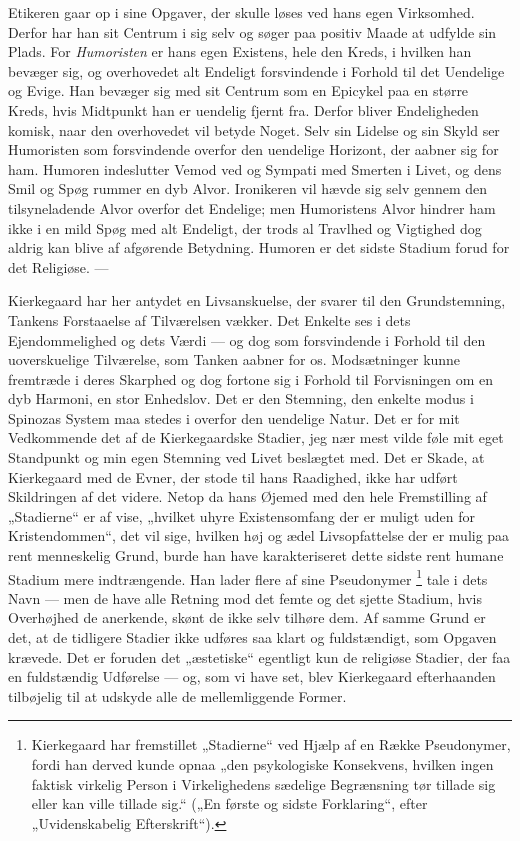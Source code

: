 \documentclass[12pt,a4paper,openany]{book}
\newcommand{\opage}[1]{\marginnote{\footnotesize\textit{[#1]}}}
\begin{document}
Etikeren gaar op i sine Opgaver, der skulle løses ved hans egen Virksomhed.
Derfor har han sit Centrum i sig selv og søger paa positiv Maade at udfylde sin
Plads. For \textit{Humoristen} er hans egen Existens, hele den Kreds, i hvilken
han bevæger sig, og overhovedet alt Endeligt forsvindende i Forhold til det
Uendelige og Evige. Han bevæger sig med sit Centrum som en Epicykel paa en
større Kreds, hvis Midtpunkt han er uendelig fjernt fra. Derfor bliver
Endeligheden komisk, naar den overhovedet vil betyde Noget. Selv sin Lidelse og
sin Skyld ser Humoristen som forsvindende overfor den uendelige Horizont, der
aabner sig for ham. Humoren indeslutter Vemod ved og Sympati med Smerten i
Livet, og dens Smil og Spøg rummer en dyb Alvor. Ironikeren vil hævde sig selv
gennem den tilsyneladende Alvor overfor det Endelige; men Humoristens Alvor
hindrer ham ikke i en mild Spøg med alt Endeligt, der trods al Travlhed og
Vigtighed dog aldrig kan blive af afgørende Betydning. Humoren er det sidste
Stadium forud for det Religiøse. ---

Kierkegaard har her antydet en Livsanskuelse, der svarer til den Grundstemning,
Tankens Forstaaelse af Tilværelsen vækker. Det Enkelte ses i dets
Ejendommelighed og dets Værdi --- og dog som forsvindende i Forhold til den
uoverskuelige Tilværelse, som Tanken aabner for os. Modsætninger kunne
fremtræde i deres Skarphed og dog fortone sig i Forhold til Forvisningen om en
dyb Harmoni, en stor Enhedslov. Det er den Stemning, den enkelte modus i
Spinozas System maa stedes i overfor den uendelige Natur. Det er for mit
Vedkommende det af de Kierkegaardske Stadier, jeg nær%
\setcounter{footnote}{0}%
\opage{161}mest vilde føle mit eget Standpunkt og min egen Stemning ved Livet
beslægtet med. Det er Skade, at Kierkegaard med de Evner, der stode til hans
Raadighed, ikke har udført Skildringen af det videre. Netop da hans Øjemed med
den hele Fremstilling af „Stadierne“ er af vise, „hvilket uhyre Existensomfang
der er muligt uden for Kristendommen“, det vil sige, hvilken høj og ædel
Livsopfattelse der er mulig paa rent menneskelig Grund, burde han have
karakteriseret dette sidste rent humane Stadium mere indtrængende. Han lader
flere af sine Pseudonymer%
\footnote[1]{Kierkegaard har fremstillet „Stadierne“ ved Hjælp af en Række
Pseudonymer, fordi han derved kunde opnaa „den psykologiske Konsekvens, hvilken
ingen faktisk virkelig Person i Virkelighedens sædelige Begrænsning tør tillade
sig eller kan ville tillade sig.“ („En første og sidste Forklaring“, efter
„Uvidenskabelig Efterskrift“).} tale i dets Navn --- men de have alle Retning
mod det femte og det sjette Stadium, hvis Overhøjhed de anerkende, skønt de
ikke selv tilhøre dem. Af samme Grund er det, at de tidligere Stadier ikke
udføres saa klart og fuldstændigt, som Opgaven krævede. Det er foruden det
„æstetiske“ egentligt kun de religiøse Stadier, der faa en fuldstændig
Udførelse --- og, som vi have set, blev Kierkegaard efterhaanden tilbøjelig til
at udskyde alle de mellemliggende Former.
\end{document}
